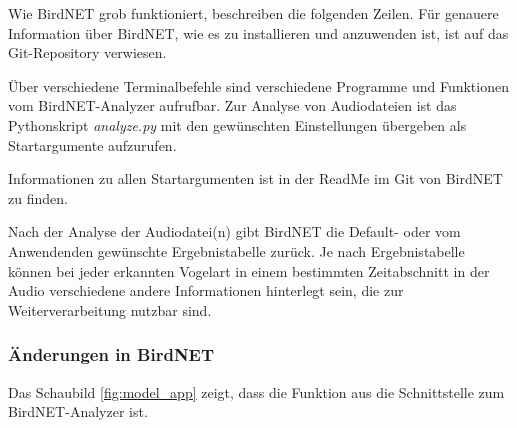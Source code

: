 Wie BirdNET grob funktioniert, beschreiben die folgenden Zeilen. Für genauere Information über BirdNET, wie es zu installieren und anzuwenden ist, ist auf das Git-Repository \cite{birdnetGit} verwiesen.





Über verschiedene Terminalbefehle sind verschiedene Programme und Funktionen vom BirdNET-Analyzer aufrufbar. Zur Analyse von Audiodateien ist das Pythonskript \textit{analyze.py} mit den gewünschten Einstellungen übergeben als Startargumente aufzurufen.


Informationen zu allen Startargumenten ist in der ReadMe im Git von BirdNET zu finden.

Nach der Analyse der Audiodatei(n) gibt BirdNET die Default- oder vom Anwendenden gewünschte Ergebnistabelle zurück. 
Je nach Ergebnistabelle können bei jeder erkannten Vogelart in einem bestimmten Zeitabschnitt in der Audio verschiedene andere Informationen hinterlegt sein, die zur Weiterverarbeitung nutzbar sind. 



\subsubsection{Änderungen in BirdNET}
\label{subsec:änderungen}

Das Schaubild %
\ref{fig:model_app} zeigt, dass die Funktion  aus  die Schnittstelle zum BirdNET-Analyzer ist. 

